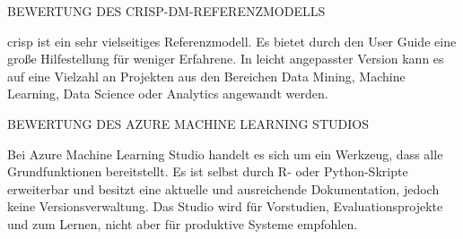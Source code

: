 {\normalsize BEWERTUNG DES CRISP-DM-REFERENZMODELLS} \par
\gls{crisp} ist ein sehr vielseitiges Referenzmodell. Es bietet durch den User Guide eine große Hilfestellung für weniger Erfahrene. In leicht angepasster Version kann es auf eine Vielzahl an Projekten aus den Bereichen Data Mining, Machine Learning, Data Science oder Analytics angewandt werden.

{\normalsize BEWERTUNG DES AZURE MACHINE LEARNING STUDIOS} \par
Bei Azure Machine Learning Studio handelt es sich um ein Werkzeug, dass alle Grundfunktionen bereitstellt. Es ist selbst durch R- oder Python-Skripte erweiterbar und besitzt eine aktuelle und ausreichende Dokumentation, jedoch keine Versionsverwaltung. Das Studio wird für Vorstudien, Evaluationsprojekte und zum Lernen, nicht aber für produktive Systeme empfohlen.
